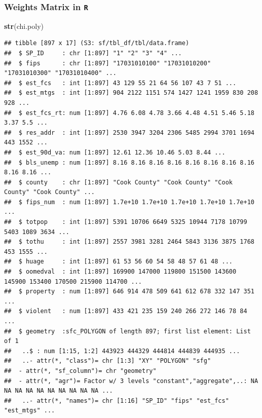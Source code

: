 \documentclass[
  shownotes,
  xcolor={svgnames},
  hyperref={colorlinks,citecolor=DarkBlue,linkcolor=DarkRed,urlcolor=DarkBlue}
  ]{beamer}
\newenvironment{Shaded}{\begin{snugshade}}{\end{snugshade}}
\newcommand{\KeywordTok}[1]{\textcolor[rgb]{0.13,0.29,0.53}{\textbf{#1}}}
\newcommand{\NormalTok}[1]{#1}
\begin{document}
\begin{frame}[fragile]
\frametitle{Weights Matrix in \texttt{R}}

\begin{scriptsize}
\begin{Shaded}
\begin{Highlighting}[]
\KeywordTok{str}\NormalTok{(chi.poly)}
\end{Highlighting}
\end{Shaded}
\end{scriptsize}
\begin{tiny}


\begin{verbatim}
## tibble [897 x 17] (S3: sf/tbl_df/tbl/data.frame)
##  $ SP_ID     : chr [1:897] "1" "2" "3" "4" ...
##  $ fips      : chr [1:897] "17031010100" "17031010200" "17031010300" "17031010400" ...
##  $ est_fcs   : int [1:897] 43 129 55 21 64 56 107 43 7 51 ...
##  $ est_mtgs  : int [1:897] 904 2122 1151 574 1427 1241 1959 830 208 928 ...
##  $ est_fcs_rt: num [1:897] 4.76 6.08 4.78 3.66 4.48 4.51 5.46 5.18 3.37 5.5 ...
##  $ res_addr  : int [1:897] 2530 3947 3204 2306 5485 2994 3701 1694 443 1552 ...
##  $ est_90d_va: num [1:897] 12.61 12.36 10.46 5.03 8.44 ...
##  $ bls_unemp : num [1:897] 8.16 8.16 8.16 8.16 8.16 8.16 8.16 8.16 8.16 8.16 ...
##  $ county    : chr [1:897] "Cook County" "Cook County" "Cook County" "Cook County" ...
##  $ fips_num  : num [1:897] 1.7e+10 1.7e+10 1.7e+10 1.7e+10 1.7e+10 ...
##  $ totpop    : int [1:897] 5391 10706 6649 5325 10944 7178 10799 5403 1089 3634 ...
##  $ tothu     : int [1:897] 2557 3981 3281 2464 5843 3136 3875 1768 453 1555 ...
##  $ huage     : int [1:897] 61 53 56 60 54 58 48 57 61 48 ...
##  $ oomedval  : int [1:897] 169900 147000 119800 151500 143600 145900 153400 170500 215900 114700 ...
##  $ property  : num [1:897] 646 914 478 509 641 612 678 332 147 351 ...
##  $ violent   : num [1:897] 433 421 235 159 240 266 272 146 78 84 ...
##  $ geometry  :sfc_POLYGON of length 897; first list element: List of 1
##   ..$ : num [1:15, 1:2] 443923 444329 444814 444839 444935 ...
##   ..- attr(*, "class")= chr [1:3] "XY" "POLYGON" "sfg"
##  - attr(*, "sf_column")= chr "geometry"
##  - attr(*, "agr")= Factor w/ 3 levels "constant","aggregate",..: NA NA NA NA NA NA NA NA NA NA ...
##   ..- attr(*, "names")= chr [1:16] "SP_ID" "fips" "est_fcs" "est_mtgs" ...
\end{verbatim}
\end{tiny}

\end{frame}
\end{document}
